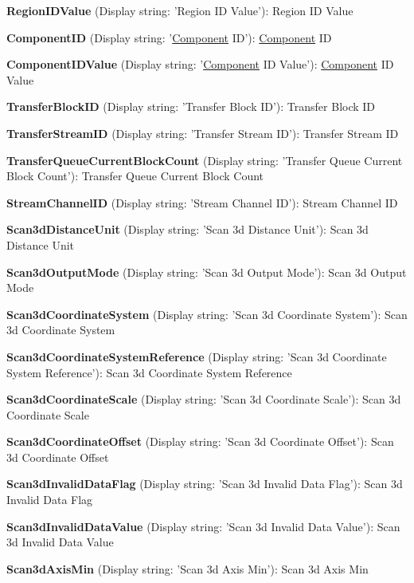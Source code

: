 \begin{DoxyItemize}
\item {\bfseries Region\+I\+D\+Value} (Display string\+: 'Region I\+D Value')\+: Region I\+D Value
\item {\bfseries Component\+I\+D} (Display string\+: '\hyperlink{classmv_i_m_p_a_c_t_1_1acquire_1_1_component}{Component} I\+D')\+: \hyperlink{classmv_i_m_p_a_c_t_1_1acquire_1_1_component}{Component} I\+D
\item {\bfseries Component\+I\+D\+Value} (Display string\+: '\hyperlink{classmv_i_m_p_a_c_t_1_1acquire_1_1_component}{Component} I\+D Value')\+: \hyperlink{classmv_i_m_p_a_c_t_1_1acquire_1_1_component}{Component} I\+D Value
\item {\bfseries Transfer\+Block\+I\+D} (Display string\+: 'Transfer Block I\+D')\+: Transfer Block I\+D
\item {\bfseries Transfer\+Stream\+I\+D} (Display string\+: 'Transfer Stream I\+D')\+: Transfer Stream I\+D
\item {\bfseries Transfer\+Queue\+Current\+Block\+Count} (Display string\+: 'Transfer Queue Current Block Count')\+: Transfer Queue Current Block Count
\item {\bfseries Stream\+Channel\+I\+D} (Display string\+: 'Stream Channel I\+D')\+: Stream Channel I\+D
\item {\bfseries Scan3d\+Distance\+Unit} (Display string\+: 'Scan 3d Distance Unit')\+: Scan 3d Distance Unit
\item {\bfseries Scan3d\+Output\+Mode} (Display string\+: 'Scan 3d Output Mode')\+: Scan 3d Output Mode
\item {\bfseries Scan3d\+Coordinate\+System} (Display string\+: 'Scan 3d Coordinate System')\+: Scan 3d Coordinate System
\item {\bfseries Scan3d\+Coordinate\+System\+Reference} (Display string\+: 'Scan 3d Coordinate System Reference')\+: Scan 3d Coordinate System Reference
\item {\bfseries Scan3d\+Coordinate\+Scale} (Display string\+: 'Scan 3d Coordinate Scale')\+: Scan 3d Coordinate Scale
\item {\bfseries Scan3d\+Coordinate\+Offset} (Display string\+: 'Scan 3d Coordinate Offset')\+: Scan 3d Coordinate Offset
\item {\bfseries Scan3d\+Invalid\+Data\+Flag} (Display string\+: 'Scan 3d Invalid Data Flag')\+: Scan 3d Invalid Data Flag
\item {\bfseries Scan3d\+Invalid\+Data\+Value} (Display string\+: 'Scan 3d Invalid Data Value')\+: Scan 3d Invalid Data Value
\item {\bfseries Scan3d\+Axis\+Min} (Display string\+: 'Scan 3d Axis Min')\+: Scan 3d Axis Min

\end{DoxyItemize}
